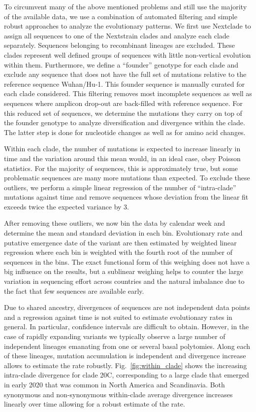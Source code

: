 \documentclass[aps,rmp, twocolumn]{revtex4}
\begin{document}
To circumvent many of the above mentioned problems and still use the majority of the available data, we use a combination of automated filtering and simple robust approaches to analyze the evolutionary patterns.
We first use Nextclade \citep{aksamentov_nextclade_2021} to assign all sequences to one of the Nextstrain clades \citep{hadfield_nextstrain_2018} and analyze each clade separately.
Sequences belonging to recombinant lineages are excluded.
These clades represent well defined groups of sequences with little non-vertical evolution within them.
Furthermore, we define a ``founder'' genotype for each clade and exclude any sequence that does not have the full set of mutations relative to the reference sequence Wuhan/Hu-1.
This founder sequence is manually curated for each clade considered.
This filtering removes most incomplete sequences as well as sequences where amplicon drop-out are back-filled with reference sequence.
For this reduced set of sequences, we determine the mutations they carry on top of the founder genotype to analyze diversification and divergence within the clade.
The latter step is done for nucleotide changes as well as for amino acid changes.

Within each clade, the number of mutations is expected to increase linearly in time and the variation around this mean would, in an ideal case, obey Poisson statistics.
For the majority of sequences, this is approximately true, but some problematic sequences are many more mutations than expected.
To exclude these outliers, we perform a simple linear regression of the number of ``intra-clade'' mutations against time and remove sequences whose deviation from the linear fit exceeds twice the expected variance by 3.


After removing these outliers, we now bin the data by calendar week and determine the mean and standard deviation in each bin.
Evolutionary rate and putative emergence date of the variant are then estimated by weighted linear regression where each bin is weighted with the fourth root of the number of sequences in the bins.
The exact functional form of this weighing does not have a big influence on the results, but a sublinear weighing helps to counter the large variation in sequencing effort across countries and the natural imbalance due to the fact that few sequences are available early.

Due to shared ancestry, divergences of sequences are not independent data points and a regression against time is not suited to estimate evolutionary rates in general.
In particular, confidence intervals are difficult to obtain.
However, in the case of rapidly expanding variants we typically observe a large number of independent lineages emanating from one or several basal polytomies.
Along each of these lineages, mutation accumulation is independent and divergence increase allows to estimate the rate robustly.
Fig.~\ref{fig:within_clade} shows the increasing intra-clade divergence for clade 20C, corresponding to a large clade that emerged in early 2020 that was common in North America and Scandinavia.
Both synonymous and non-synonymous within-clade average divergence increases linearly over time allowing for a robust estimate of the rate.
\end{document}
